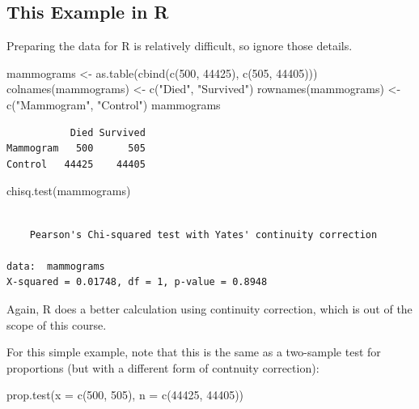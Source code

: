 \documentclass[
  letterpaper,
  DIV=11,
  numbers=noendperiod,
  oneside]{scrreprt}
\newenvironment{Shaded}{\begin{snugshade}}{\end{snugshade}}
\newcommand{\AttributeTok}[1]{\textcolor[rgb]{0.40,0.45,0.13}{#1}}
\newcommand{\DecValTok}[1]{\textcolor[rgb]{0.68,0.00,0.00}{#1}}
\newcommand{\FunctionTok}[1]{\textcolor[rgb]{0.28,0.35,0.67}{#1}}
\newcommand{\NormalTok}[1]{\textcolor[rgb]{0.00,0.23,0.31}{#1}}
\newcommand{\OtherTok}[1]{\textcolor[rgb]{0.00,0.23,0.31}{#1}}
\newcommand{\StringTok}[1]{\textcolor[rgb]{0.13,0.47,0.30}{#1}}
\begin{document}
\hypertarget{this-example-in-r}{%
\subsection{This Example in R}\label{this-example-in-r}}

Preparing the data for R is relatively difficult, so ignore those
details.

\begin{Shaded}
\begin{Highlighting}[]
\NormalTok{mammograms }\OtherTok{\textless{}{-}} \FunctionTok{as.table}\NormalTok{(}\FunctionTok{cbind}\NormalTok{(}\FunctionTok{c}\NormalTok{(}\DecValTok{500}\NormalTok{, }\DecValTok{44425}\NormalTok{), }\FunctionTok{c}\NormalTok{(}\DecValTok{505}\NormalTok{, }\DecValTok{44405}\NormalTok{)))}
\FunctionTok{colnames}\NormalTok{(mammograms) }\OtherTok{\textless{}{-}} \FunctionTok{c}\NormalTok{(}\StringTok{"Died"}\NormalTok{, }\StringTok{"Survived"}\NormalTok{)}
\FunctionTok{rownames}\NormalTok{(mammograms) }\OtherTok{\textless{}{-}} \FunctionTok{c}\NormalTok{(}\StringTok{"Mammogram"}\NormalTok{, }\StringTok{"Control"}\NormalTok{)}
\NormalTok{mammograms}
\end{Highlighting}
\end{Shaded}

\begin{verbatim}
           Died Survived
Mammogram   500      505
Control   44425    44405
\end{verbatim}

\begin{Shaded}
\begin{Highlighting}[]
\FunctionTok{chisq.test}\NormalTok{(mammograms)}
\end{Highlighting}
\end{Shaded}

\begin{verbatim}

    Pearson's Chi-squared test with Yates' continuity correction

data:  mammograms
X-squared = 0.01748, df = 1, p-value = 0.8948
\end{verbatim}

Again, R does a better calculation using continuity correction, which is
out of the scope of this course.

For this simple example, note that this is the same as a two-sample test
for proportions (but with a different form of contnuity correction):

\begin{Shaded}
\begin{Highlighting}[]
\FunctionTok{prop.test}\NormalTok{(}\AttributeTok{x =} \FunctionTok{c}\NormalTok{(}\DecValTok{500}\NormalTok{, }\DecValTok{505}\NormalTok{), }\AttributeTok{n =} \FunctionTok{c}\NormalTok{(}\DecValTok{44425}\NormalTok{, }\DecValTok{44405}\NormalTok{))}
\end{Highlighting}
\end{Shaded}
\end{document}
